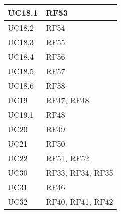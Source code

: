 \begin{center}
\begin{longtable}{|C{5cm}|C{5cm}|}
    \hline
    UC18.1 & RF53 \\
    \hline
    UC18.2 & RF54 \\
    \hline
    UC18.3 & RF55 \\
    \hline
    UC18.4 & RF56 \\
    \hline
    UC18.5 & RF57 \\
    \hline
    UC18.6 & RF58 \\
    \hline
    UC19 & RF47, RF48 \\
    \hline
    UC19.1 & RF48 \\
    \hline
    UC20 & RF49 \\
    \hline
    UC21 & RF50 \\
    \hline
    UC22 & RF51, RF52 \\
    \hline
    UC30 & RF33, RF34, RF35 \\
    \hline
    UC31 & RF46 \\
    \hline
    UC32 & RF40, RF41, RF42 \\
    \hline
\end{longtable}
\end{center}
